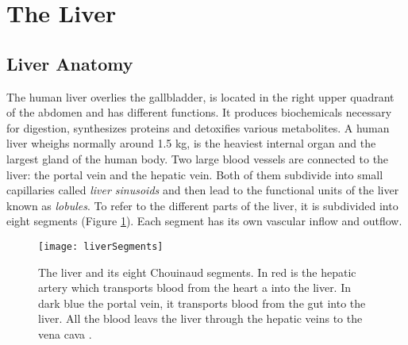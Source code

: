 


\section{The Liver} 
\subsection{Liver Anatomy}
The human liver overlies the gallbladder, is located in the right upper quadrant of the abdomen and has
different functions. It produces biochemicals necessary for digestion,
synthesizes proteins and detoxifies various metabolites. A human liver wheighs
normally around 1.5 kg, is the heaviest internal organ and the largest gland
of the human body. Two large blood vessels are connected to the liver: the
portal vein and the hepatic vein. Both of them subdivide into small
capillaries called \textit{liver sinusoids} and then lead to the functional
units of the liver known as \textit{lobules}. To refer to the different parts of
the liver, it is subdivided into eight segments (Figure \ref{fig:liverSegments}). Each segment has its own
vascular inflow and outflow.
\begin{figure}[H]
  \centering
 \texttt{[image: liverSegments]}
  \caption{The liver and its eight Chouinaud segments. In red is the hepatic
    artery which transports blood from the heart a into the liver. In dark blue
    the portal vein, it transports blood from the gut into the liver. All the
    blood leavs the liver through the hepatic veins to the vena cava \cite{siriwardena2014management}.}
  \label{fig:liverSegments}
\end{figure}

